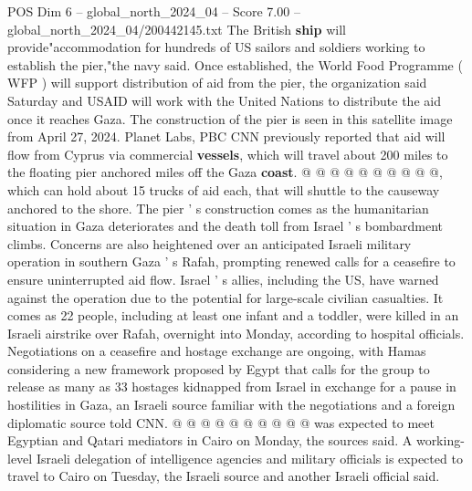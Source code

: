 \begin{textsample}{POS Dim 6 – global\_north\_2024\_04 – Score 7.00 – global\_north\_2024\_04/200442145.txt}
The British \textbf{ship} will provide"accommodation for hundreds of US sailors and soldiers working to establish the pier,"the navy said.
Once established, the World Food Programme ( WFP ) will support distribution of aid from the pier, the organization said Saturday and USAID will work with the United Nations to distribute the aid once it reaches Gaza.
The construction of the pier is seen in this satellite image from April 27, 2024.
Planet Labs, PBC CNN previously reported that aid will flow from Cyprus via commercial \textbf{vessels}, which will travel about 200 miles to the floating pier anchored miles off the Gaza \textbf{coast}. @ @ @ @ @ @ @ @ @ @, which can hold about 15 trucks of aid each, that will shuttle to the causeway anchored to the shore.
The pier ' s construction comes as the humanitarian situation in Gaza deteriorates and the death toll from Israel ' s bombardment climbs.
Concerns are also heightened over an anticipated Israeli military operation in southern Gaza ' s Rafah, prompting renewed calls for a ceasefire to ensure uninterrupted aid flow.
Israel ' s allies, including the US, have warned against the operation due to the potential for large-scale civilian casualties.
It comes as 22 people, including at least one infant and a toddler, were killed in an Israeli airstrike over Rafah, overnight into Monday, according to hospital officials.
Negotiations on a ceasefire and hostage exchange are ongoing, with Hamas considering a new framework proposed by Egypt that calls for the group to release as many as 33 hostages kidnapped from Israel in exchange for a pause in hostilities in Gaza, an Israeli source familiar with the negotiations and a foreign diplomatic source told CNN. @ @ @ @ @ @ @ @ @ @ was expected to meet Egyptian and Qatari mediators in Cairo on Monday, the sources said.
A working-level Israeli delegation of intelligence agencies and military officials is expected to travel to Cairo on Tuesday, the Israeli source and another Israeli official said.

\end{textsample}
